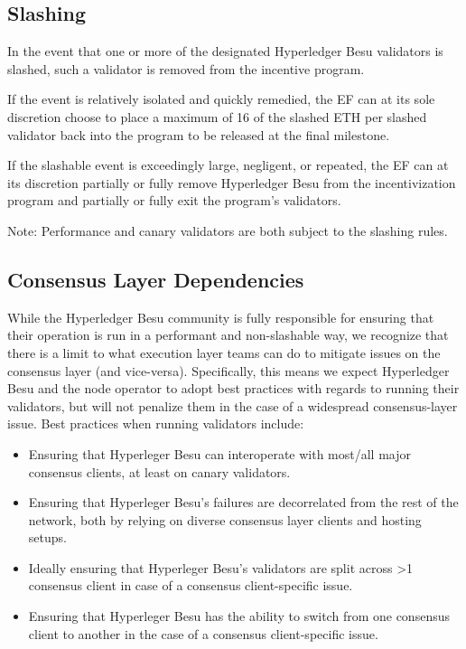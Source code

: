 \subsection{Slashing}
In the event that one or more of the designated Hyperledger Besu validators is slashed, such a validator is removed from the incentive program.

If the event is relatively isolated and quickly remedied, the EF can at its sole discretion choose to place a maximum of 16 of the slashed ETH per slashed validator back into the program to be released at the final milestone.

If the slashable event is exceedingly large, negligent, or repeated, the EF can at its discretion partially or fully remove Hyperledger Besu from the incentivization program and partially or fully exit the program’s validators.

Note: Performance and canary validators are both subject to the slashing rules.

\subsection{Consensus Layer Dependencies}
While the Hyperledger Besu community is fully responsible for ensuring that their operation is run in a performant and non-slashable way, we recognize that there is a limit to what execution layer teams can do to mitigate issues on the consensus layer (and vice-versa). Specifically, this means we expect Hyperledger Besu and the node operator to adopt best practices with regards to running their validators, but will not penalize them in the case of a widespread consensus-layer issue. Best practices when running validators include:
\begin{itemize}
\item Ensuring that Hyperleger Besu can interoperate with most/all major consensus clients, at least on canary validators.
\item Ensuring that Hyperleger Besu’s failures are decorrelated from the rest of the network, both by relying on diverse consensus layer clients and hosting setups.
\item Ideally ensuring that Hyperleger Besu’s validators are split across >1 consensus client in case of a consensus client-specific issue.
\item Ensuring that Hyperleger Besu has the ability to switch from one consensus client to another in the case of a consensus client-specific issue.
\end{itemize}